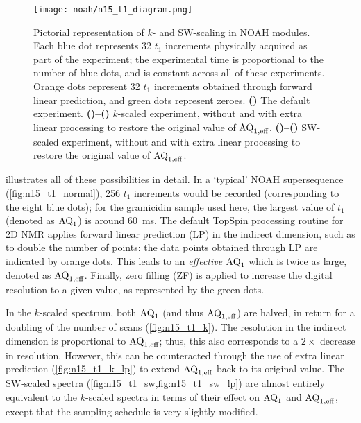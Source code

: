 \begin{figure}[!ht]
    \centering
    \texttt{[image: noah/n15\_t1\_diagram.png]}%
    {\label{fig:n15_t1_normal}}%
    {\label{fig:n15_t1_k}}%
    {\label{fig:n15_t1_k_lp}}%
    {\label{fig:n15_t1_sw}}%
    {\label{fig:n15_t1_sw_lp}}%
    \caption[Pictorial representation of $k$- and SW-scaling in NOAH \nitrogen{} modules]{
        Pictorial representation of $k$- and SW-scaling in NOAH \nitrogen{} modules.
        Each blue dot represents 32 $t_1$ increments physically acquired as part of the experiment; the experimental time is proportional to the number of blue dots, and is constant across all of these experiments.
        Orange dots represent 32 $t_1$ increments obtained through forward linear prediction, and green dots represent zeroes.
        \textbf{()} The default experiment.
        \textbf{()--()} $k$-scaled experiment, without and with extra linear processing to restore the original value of $\text{AQ}_{1,\text{eff}}$.
        \textbf{()--()} SW-scaled experiment, without and with extra linear processing to restore the original value of $\text{AQ}_{1,\text{eff}}$.
    }
    \label{fig:n15_t1}
\end{figure}

 illustrates all of these possibilities in detail.
In a `typical' NOAH supersequence (\cref{fig:n15_t1_normal}), 256 $t_1$ increments would be recorded (corresponding to the eight blue dots);
for the gramicidin sample used here, the largest value of $t_1$ (denoted as $\text{AQ}_1$) is around \qty{60}{\ms}.
The default TopSpin processing routine for 2D NMR applies forward linear prediction (LP)\autocite{Ni1986JMR,Tirendi1989JMR,Led1991CR,Koehl1999PNMRS} in the indirect dimension, such as to double the number of points: the data points obtained through LP are indicated by orange dots.
This leads to an \textit{effective} $\text{AQ}_1$ which is twice as large, denoted as $\text{AQ}_{1,\text{eff}}$.
Finally, zero filling (ZF) is applied to increase the digital resolution to a given value, as represented by the green dots.

In the $k$-scaled spectrum, both $\text{AQ}_1$ (and thus $\text{AQ}_{1,\text{eff}}$) are halved, in return for a doubling of the number of scans (\cref{fig:n15_t1_k}).
The resolution in the indirect dimension is proportional to $\text{AQ}_{1,\text{eff}}$; thus, this also corresponds to a $2\times$ decrease in resolution.
However, this can be counteracted through the use of extra linear prediction (\cref{fig:n15_t1_k_lp}) to extend $\text{AQ}_{1,\text{eff}}$ back to its original value.
The SW-scaled spectra (\cref{fig:n15_t1_sw,fig:n15_t1_sw_lp}) are almost entirely equivalent to the $k$-scaled spectra in terms of their effect on $\text{AQ}_1$ and $\text{AQ}_{1,\text{eff}}$, except that the sampling schedule is very slightly modified.

